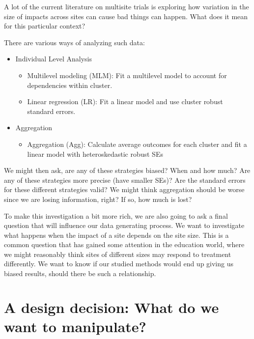 \documentclass[
]{book}
\providecommand{\tightlist}{%
  \setlength{\itemsep}{0pt}\setlength{\parskip}{0pt}}
\begin{document}
A lot of the current literature on multisite trials is exploring how variation in the size of impacts across sites can cause bad things can happen. What does it mean for this particular context?

There are various ways of analyzing such data:

\begin{itemize}
\tightlist
\item
  Individual Level Analysis

  \begin{itemize}
  \tightlist
  \item
    Multilevel modeling (MLM): Fit a multilevel model to account for dependencies within cluster.
  \item
    Linear regression (LR): Fit a linear model and use cluster robust standard errors.
  \end{itemize}
\item
  Aggregation

  \begin{itemize}
  \tightlist
  \item
    Aggregation (Agg): Calculate average outcomes for each cluster and fit a linear model with heteroskedastic robust SEs
  \end{itemize}
\end{itemize}

We might then ask, are any of these strategies biased? When and how much?
Are any of these strategies more precise (have smaller SEs)?
Are the standard errors for these different strategies valid?
We might think aggregation should be worse since we are losing information, right?
If so, how much is lost?

To make this investigation a bit more rich, we are also going to ask a final question that will influence our data generating process.
We want to investigate what happens when the impact of a site depends on the site size.
This is a common question that has gained some attention in the education world, where we might reasonably think sites of different sizes may respond to treatment differently.
We want to know if our studied methods would end up giving us biased results, should there be such a relationship.

\hypertarget{a-design-decision-what-do-we-want-to-manipulate}{%
\section{A design decision: What do we want to manipulate?}\label{a-design-decision-what-do-we-want-to-manipulate}}
\end{document}
